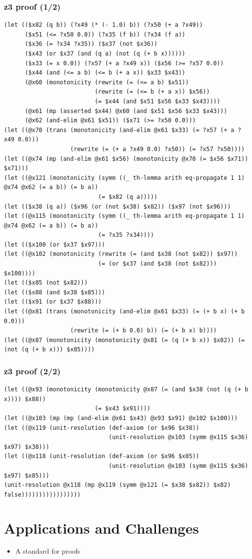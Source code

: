 \documentclass[svgnames,table,mathserif]{beamer}
\begin{document}
\begin{frame}[fragile]
\frametitle{z3 proof (1/2)}

{\tiny
\begin{verbatim}
(let (($x82 (q b)) (?x49 (* (- 1.0) b)) (?x50 (+ a ?x49))
      ($x51 (<= ?x50 0.0)) (?x35 (f b)) (?x34 (f a))
      ($x36 (= ?x34 ?x35)) ($x37 (not $x36))
      ($x43 (or $x37 (and (q a) (not (q (+ b x))))))
      ($x33 (= x 0.0)) (?x57 (+ a ?x49 x)) ($x56 (>= ?x57 0.0))
      ($x44 (and (<= a b) (<= b (+ a x)) $x33 $x43))
      (@x60 (monotonicity (rewrite (= (<= a b) $x51))
                          (rewrite (= (<= b (+ a x)) $x56))
                          (= $x44 (and $x51 $x56 $x33 $x43))))
      (@x61 (mp (asserted $x44) @x60 (and $x51 $x56 $x33 $x43)))
      (@x62 (and-elim @x61 $x51)) ($x71 (>= ?x50 0.0)))
(let ((@x70 (trans (monotonicity (and-elim @x61 $x33) (= ?x57 (+ a ?x49 0.0)))
                   (rewrite (= (+ a ?x49 0.0) ?x50)) (= ?x57 ?x50))))
(let ((@x74 (mp (and-elim @x61 $x56) (monotonicity @x70 (= $x56 $x71)) $x71)))
(let ((@x121 (monotonicity (symm ((_ th-lemma arith eq-propagate 1 1) @x74 @x62 (= a b)) (= b a))
                           (= $x82 (q a)))))
(let (($x38 (q a)) ($x96 (or (not $x38) $x82)) ($x97 (not $x96)))
(let ((@x115 (monotonicity (symm ((_ th-lemma arith eq-propagate 1 1) @x74 @x62 (= a b)) (= b a))
                           (= ?x35 ?x34))))
(let (($x100 (or $x37 $x97)))
(let ((@x102 (monotonicity (rewrite (= (and $x38 (not $x82)) $x97))
                           (= (or $x37 (and $x38 (not $x82))) $x100))))
(let (($x85 (not $x82)))
(let (($x88 (and $x38 $x85)))
(let (($x91 (or $x37 $x88)))
(let ((@x81 (trans (monotonicity (and-elim @x61 $x33) (= (+ b x) (+ b 0.0)))
                   (rewrite (= (+ b 0.0) b)) (= (+ b x) b))))
(let ((@x87 (monotonicity (monotonicity @x81 (= (q (+ b x)) $x82)) (= (not (q (+ b x))) $x85))))
\end{verbatim}
}

\end{frame}

\begin{frame}[fragile]
\frametitle{z3 proof (2/2)}

{\tiny
\begin{verbatim}
(let ((@x93 (monotonicity (monotonicity @x87 (= (and $x38 (not (q (+ b x)))) $x88))
                          (= $x43 $x91))))
(let ((@x103 (mp (mp (and-elim @x61 $x43) @x93 $x91) @x102 $x100)))
(let ((@x119 (unit-resolution (def-axiom (or $x96 $x38))
                              (unit-resolution @x103 (symm @x115 $x36) $x97) $x38)))
(let ((@x118 (unit-resolution (def-axiom (or $x96 $x85))
                              (unit-resolution @x103 (symm @x115 $x36) $x97) $x85)))
(unit-resolution @x118 (mp @x119 (symm @x121 (= $x38 $x82)) $x82) false)))))))))))))))))
\end{verbatim}
}

\end{frame}

\section{Applications and Challenges}

\begin{frame}
  
  \begin{itemize}
    \item A standard for proofs
  \end{itemize}

\end{frame}
\end{document}

